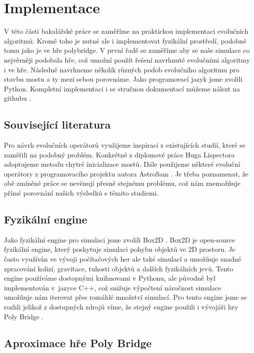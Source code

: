 \chapter{Implementace}

V této části bakalářské práce se zaměříme na praktickou implementaci evolučních algoritmů. Kromě toho je nutné ale i implementovat fyzikální prostředí, podobné tomu jako je ve hře polybridge. V první řadě se zaměříme aby se naše simulace co nejvěrněji podobala hře, což umožní použít řešení navrhnuté evolučními algoritmy i ve hře. Následně navrhneme několik různých podob evolučního algoritmu pro stavbu mostu a ty mezi sebou porovnáme. Jako programovací jazyk jsme zvolili Python. Kompletní implementaci i se stručnou dokumentací můžeme nálezt na githubu \cite{git}.

\section{Související literatura}

Pro návrh evolučních operátorů využijeme inspiraci z existujících studií, které se zaměřili na podobný problém. Konkrétně z diplomové práce Huga Lispectora \cite{Lispector2022} adoptujeme metodu chytré inicializace mostů. Dále použijeme některé evoluční operátory z programovacího projektu autora AstroSam \cite{AstroSam2023}. Je třeba poznamenat, že obě zmíněné práce se nevěnují přesně stejnému problému, což nám znemožňuje přímé porovnání našich výsledků s těmito studiemi.

\section{Fyzikální engine}

Jako fyzikální engine pro simulaci jsme zvolili Box2D \cite{box2d}. Box2D je open-source fyzikální engine, který poskytuje simulaci pohybu objektů ve 2D prostoru. Je často využíván ve vývoji počítačových her ale také simulací a umožňuje snadné zpracování kolizí, gravitace, tuhosti objektů a dalších fyzikálních jevů. Tento engine používáme dostopnými knihnovami v Pythonu, ale původně byl implementován v~jazyce C++, což snižuje výpočtení náročnost simulace umožňuje nám iterovat přes rozsáhlé množství simulací. Pro tento engine jsme se rozhli jelikož z dostupných zdrojů víme, že stejný engine použili i vývojáři hry Poly Bridge \cite{Reddit}. 

\section{Aproximace hře Poly Bridge}

